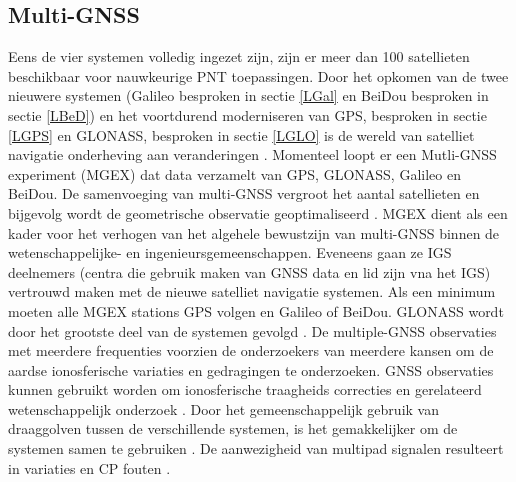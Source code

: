 \subsection{Multi-GNSS}
Eens de vier systemen volledig ingezet zijn, zijn er meer dan 100 satellieten beschikbaar voor nauwkeurige PNT toepassingen. Door het opkomen van de twee nieuwere systemen (Galileo besproken in sectie \ref{LGal} en BeiDou besproken in sectie \ref{LBeD}) en het voortdurend moderniseren van GPS, besproken in sectie \ref{LGPS} en GLONASS, besproken in sectie \ref{LGLO} is de wereld van satelliet navigatie onderheving aan veranderingen \cite{LBibGNSS4}. Momenteel loopt er een Mutli-GNSS experiment (MGEX) dat data verzamelt van GPS, GLONASS, Galileo en BeiDou. De samenvoeging van multi-GNSS vergroot het aantal satellieten en bijgevolg wordt de geometrische observatie geoptimaliseerd \cite{LBibGNSS5}. 
MGEX dient als een kader voor het verhogen van het algehele bewustzijn van multi-GNSS binnen de wetenschappelijke- en ingenieursgemeenschappen. Eveneens gaan ze IGS deelnemers (centra die gebruik maken van GNSS data en lid zijn vna het IGS) vertrouwd maken met de nieuwe satelliet navigatie systemen. Als een minimum moeten alle MGEX stations GPS volgen en Galileo of BeiDou. GLONASS wordt door het grootste deel van de systemen gevolgd \cite{LBibGNSS9}.  De multiple-GNSS observaties met meerdere frequenties voorzien de onderzoekers van meerdere kansen om de aardse ionosferische variaties en gedragingen te onderzoeken. GNSS observaties kunnen gebruikt worden om ionosferische traagheids correcties en gerelateerd wetenschappelijk onderzoek \cite{LBibBeiDou}. Door het gemeenschappelijk gebruik van draaggolven tussen de verschillende systemen, is het gemakkelijker om de systemen samen te gebruiken \cite{LBibPPP2}. De aanwezigheid van multipad signalen resulteert in variaties en CP fouten \cite{LBibGalileo3}. 

